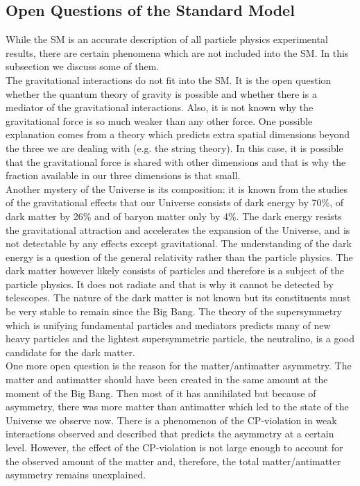 \subsection{Open Questions of the Standard Model}


While the SM is an accurate description of all particle physics experimental results, there are certain phenomena which are not included into the SM. In this subsection we discuss some of them.\\

The gravitational interactions do not fit into the SM. It is the open question whether the quantum theory of gravity is possible and whether there is a mediator of the gravitational interactions. Also, it is not known why the gravitational force is so much weaker than any other force. One possible explanation comes from a theory which predicts extra spatial dimensions beyond the three we are dealing with (e.g. the string theory). In this case, it is possible that the gravitational force is shared with other dimensions and that is why the fraction available in our three dimensions is that small.\\

Another mystery of the Universe is its composition: it is known from the studies of the gravitational effects that our Universe consists of dark energy by 70\%, of dark matter by 26\% and of baryon matter only by 4\%. The dark energy resists the gravitational attraction and accelerates the expansion of the Universe, and is not detectable by any effects except gravitational. The understanding of the dark energy is a question of the general relativity rather than the particle physics. The dark matter however likely consists of particles and therefore is a subject of the particle physics. It does not radiate and that is why it cannot be detected by telescopes. The nature of the dark matter is not known but its constituents must be very stable to remain since the Big Bang. The theory of the supersymmetry which is unifying fundamental particles and mediators predicts many of new heavy particles and the lightest supersymmetric particle, the neutralino, is a good candidate for the dark matter.\\

One more open question is the reason for the matter/antimatter asymmetry. The matter and antimatter should have been created in the same amount at the moment of the Big Bang. Then most of it has annihilated but because of asymmetry, there was more matter than antimatter which led to the state of the Universe we observe now. There is a phenomenon of the CP-violation in weak interactions observed and described that predicts the asymmetry at a certain level. However, the effect of the CP-violation is not large enough to account for the observed amount of the matter and, therefore, the total matter/antimatter asymmetry remains unexplained. \\

